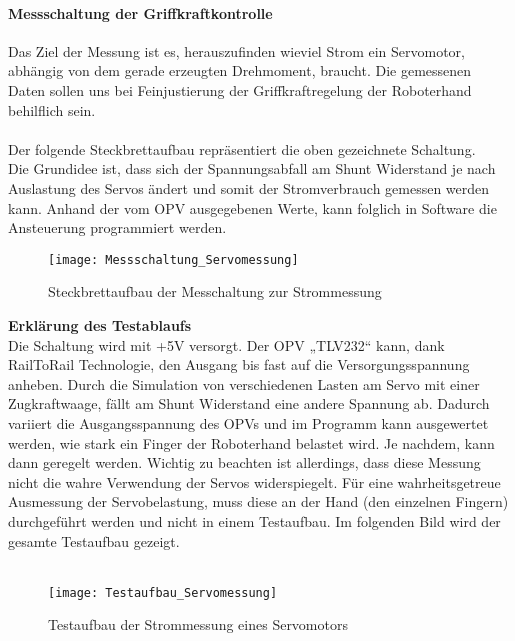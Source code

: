 \documentclass[titlepage,12pt,twoside]{article}
\begin{document}
\paragraph{Messschaltung der Griffkraftkontrolle}
\hfill \break
\hfill \break
Das Ziel der Messung ist es, herauszufinden wieviel Strom ein Servomotor, abhängig von dem gerade erzeugten Drehmoment, 
braucht. Die gemessenen Daten sollen uns bei Feinjustierung der Griffkraftregelung der Roboterhand behilflich sein. \\
\\
Der folgende Steckbrettaufbau repräsentiert die oben gezeichnete Schaltung. \\
Die Grundidee ist, dass sich der Spannungsabfall am Shunt Widerstand je nach Auslastung des Servos ändert und somit der 
Stromverbrauch gemessen werden kann. Anhand der vom OPV ausgegebenen Werte, kann folglich in Software die Ansteuerung programmiert 
werden. \\
\begin{figure}[H]
	\begin{center}
		\scalebox{1.2}
		{\texttt{[image: Messschaltung\_Servomessung]}}
		\caption{Steckbrettaufbau der Messchaltung zur Strommessung}
		\label{fig:Messschaltung_Servomessung}		
	\end{center}
\end{figure}
\hfill \break
\textbf{Erklärung des Testablaufs}\\
Die Schaltung wird mit +5V versorgt. Der OPV „TLV232“ kann, dank RailToRail Technologie, den Ausgang bis fast auf die 
Versorgungsspannung anheben. Durch die Simulation von verschiedenen Lasten am Servo mit einer Zugkraftwaage, fällt am Shunt 
Widerstand eine andere Spannung ab. Dadurch variiert die Ausgangsspannung des OPVs und im Programm kann ausgewertet werden, 
wie stark ein Finger der Roboterhand belastet wird. Je nachdem, kann dann geregelt werden. 
Wichtig zu beachten ist allerdings, dass diese Messung nicht die wahre Verwendung der Servos widerspiegelt. Für eine 
wahrheitsgetreue Ausmessung der Servobelastung, muss diese an der Hand (den einzelnen Fingern) durchgeführt werden und nicht 
in einem Testaufbau. Im folgenden Bild wird der gesamte Testaufbau gezeigt. \\
\\
\begin{figure}[H]
	\begin{center}
		\scalebox{1.2}
		{\texttt{[image: Testaufbau\_Servomessung]}}
		\caption{Testaufbau der Strommessung eines Servomotors}
		\label{fig:Testaufbau_Servomessung}		
	\end{center}
\end{figure}
\end{document}
